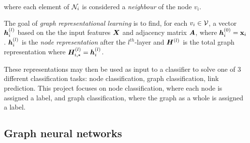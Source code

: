 where each element of ${\mathcal{N}}_i$ is considered a \emph{neighbour} of the node $v_i$.


The goal of \emph{graph representational learning} is to find, for each $v_i \in {\mathcal{V}}$, a vector ${\bm{h}}_i^{(l)}$ based on the the input features ${\bm{X}}$ and adjacency matrix ${\bm{A}}$, where ${\bm{h}}_i^{(0)} = {\textbf{x}}_i$.
${\bm{h}}_i^{(l)}$ is the \emph{node representation} after the $l^{th}$-layer and ${\bm{H}}^{(l)}$ is the total graph representation where ${\bm{H}}_{i, \star}^{(l)} = {\bm{h}}_i^{(l)}$.



These representations may then be used as input to a classifier to solve one of 3 different classification tasks: node classification, graph classification, link prediction.
This project focuses on node classification, where each node is assigned a label, and graph classification, where the graph as a whole is assigned a label.

\subsection{Graph neural networks}
\label{sec:GNNs}

